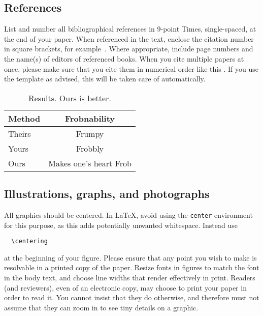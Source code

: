 \documentclass[10pt,twocolumn,letterpaper]{article}
\begin{document}

    \subsection{References}

    List and number all bibliographical references in 9-point Times, single-spaced, at the end of your paper.
    When referenced in the text, enclose the citation number in square brackets, for
    example~\cite{Authors14}.
    Where appropriate, include page numbers and the name(s) of editors of referenced books.
    When you cite multiple papers at once, please make sure that you cite them in numerical order like this \cite{Alpher02,Alpher03,Alpher05,Authors14b,Authors14}.
    If you use the template as advised, this will be taken care of automatically.

    \begin{table}
        \centering
        \begin{tabular}{@{}lc@{}}
            \toprule
            Method & Frobnability           \\
            \midrule
            Theirs & Frumpy                 \\
            Yours  & Frobbly                \\
            Ours   & Makes one's heart Frob \\
            \bottomrule
        \end{tabular}
        \caption{Results. Ours is better.}
        \label{tab:example}
    \end{table}


    \subsection{Illustrations, graphs, and photographs}

    All graphics should be centered.
    In \LaTeX, avoid using the \texttt{center} environment for this purpose, as this adds potentially unwanted whitespace.
    Instead use
        {\small\begin{verbatim}
  \centering
    \end{verbatim}}
    at the beginning of your figure.
    Please ensure that any point you wish to make is resolvable in a printed copy of the paper.
    Resize fonts in figures to match the font in the body text, and choose line widths that render effectively in print.
    Readers (and reviewers), even of an electronic copy, may choose to print your paper in order to read it.
    You cannot insist that they do otherwise, and therefore must not assume that they can zoom in to see tiny details on a graphic.
\end{document}
